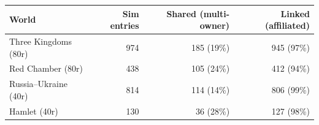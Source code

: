 \begin{tabular}{lrrr}
\toprule
World & Sim entries & Shared (multi-owner) & Linked (affiliated) \\
\midrule
Three Kingdoms (80r) & 974 & 185 (19\%) & 945 (97\%) \\
Red Chamber (80r) & 438 & 105 (24\%) & 412 (94\%) \\
Russia--Ukraine (40r) & 814 & 114 (14\%) & 806 (99\%) \\
Hamlet (40r) & 130 & 36 (28\%) & 127 (98\%) \\
\bottomrule
\end{tabular}
